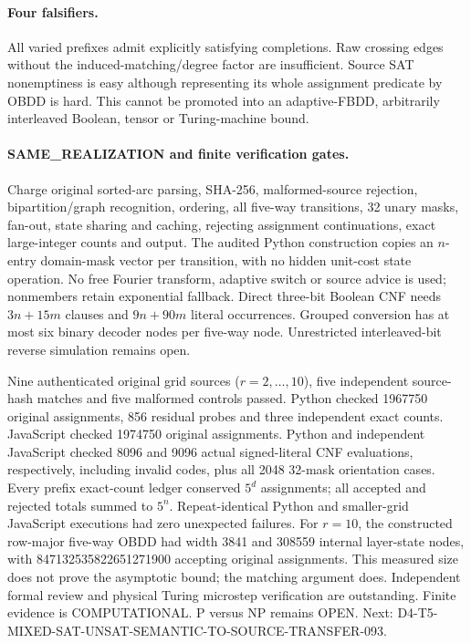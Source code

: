 \documentclass[11pt]{article}
\begin{document}
\paragraph{Four falsifiers.}
All varied prefixes admit explicitly satisfying completions.
Raw crossing edges without the induced-matching/degree factor
are insufficient. Source SAT nonemptiness is easy although
representing its whole assignment predicate by OBDD is hard.
This cannot be promoted into an adaptive-FBDD,
arbitrarily interleaved Boolean, tensor or Turing-machine bound.

\paragraph{SAME\_REALIZATION and finite verification gates.}
Charge original sorted-arc parsing, SHA-256, malformed-source
rejection, bipartition/graph recognition, ordering, all five-way
transitions, 32 unary masks, fan-out, state sharing and caching,
rejecting assignment continuations, exact large-integer
counts and output. The audited Python construction copies an
$n$-entry domain-mask vector per transition, with no hidden
unit-cost state operation. No free Fourier transform, adaptive
switch or source advice is used; nonmembers retain exponential
fallback. Direct three-bit Boolean CNF needs $3n+15m$
clauses and $9n+90m$ literal occurrences. Grouped conversion
has at most six binary decoder nodes per five-way node.
Unrestricted interleaved-bit reverse simulation remains open.

Nine authenticated original grid sources ($r=2,\ldots,10$),
five independent source-hash matches and five malformed controls
passed. Python checked 1967750 original assignments,
856 residual probes and three independent exact counts.
JavaScript checked 1974750 original assignments.
Python and independent JavaScript checked 8096 and 9096
actual signed-literal CNF evaluations, respectively, including
invalid codes, plus all 2048 32-mask orientation cases.
Every prefix exact-count ledger conserved $5^d$ assignments;
all accepted and rejected totals summed to $5^n$.
Repeat-identical Python and smaller-grid JavaScript executions
had zero unexpected failures. For $r=10$, the constructed
row-major five-way OBDD had width 3841 and 308559
internal layer-state nodes, with 847132535822651271900
accepting original assignments. This measured size does
not prove the asymptotic bound; the matching argument does.
Independent formal review and physical Turing microstep
verification are outstanding. Finite evidence is COMPUTATIONAL.
P versus NP remains OPEN.
Next: D4-T5-MIXED-SAT-UNSAT-SEMANTIC-TO-SOURCE-TRANSFER-093.
\end{document}
